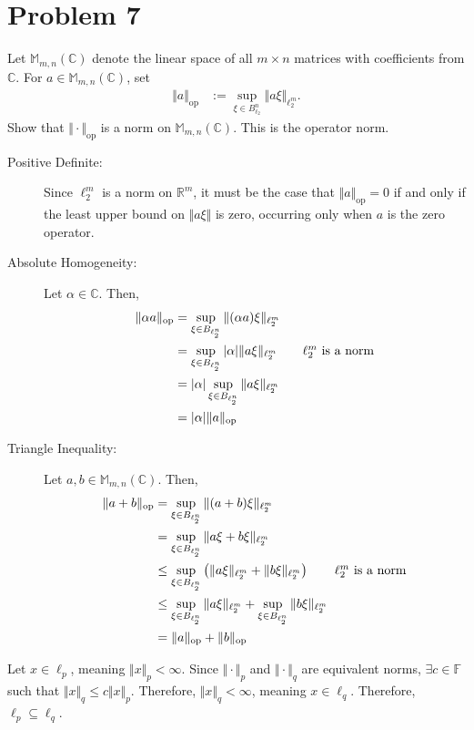 \documentclass[10pt]{extarticle}
\newcommand{\R}{\mathbb{R}}
\begin{document}
  \section{Problem 7}%
  Let $\mathbb{M}_{m,n}(\mathbb{C})$ denote the linear space of all $m\times n$ matrices with coefficients from $\mathbb{C}$. For $a\in \mathbb{M}_{m,n}(\mathbb{C})$, set
  \begin{align*}
    \Vert a\Vert_{\text{op}} &:= \sup_{\xi\in B_{\ell_2}^n}\Vert a\xi\Vert_{\ell_2^{m}}.
  \end{align*}
  Show that $\Vert \cdot \Vert_{\text{op}}$ is a norm on $\mathbb{M}_{m,n}(\mathbb{C})$. This is the operator norm.
  \begin{description}
    \item[Positive Definite:] Since $\ell_{2}^{m}$ is a norm on $\R^m$, it must be the case that $\Vert a\Vert_{\text{op}} = 0$ if and only if the least upper bound on $\Vert a\xi\Vert$ is zero, occurring only when $a$ is the zero operator.
    \item[Absolute Homogeneity:] Let $\alpha\in \mathbb{C}$. Then,
      \begin{align*}
        \Vert \alpha a \Vert_{\text{op}} &= \sup_{\xi\in B_{\ell_2^{n}}}\Vert (\alpha a)\xi\Vert_{\ell_{2}^{m}}\\
                                         &= \sup_{\xi\in B_{\ell_{2}^{n}}}|\alpha|\Vert a \xi \Vert_{\ell_{2}^{m}}\tag*{$\ell_{2}^{m}$ is a norm}\\
                                         &= |\alpha|\sup_{\xi\in B_{\ell_2^{n}}}\Vert a \xi\Vert_{\ell_{2}^{m}}\\
                                         &= |\alpha|\Vert a \Vert_{\text{op}}
      \end{align*}
    \item[Triangle Inequality:] Let $a,b \in \mathbb{M}_{m,n}(\mathbb{C})$. Then,
      \begin{align*}
        \Vert a + b \Vert_{\text{op}} &= \sup_{\xi\in B_{\ell_{2}^{n}}} \Vert (a+b)\xi\Vert_{\ell_{2}^{m}}\\
                                      &= \sup_{\xi \in B_{\ell_{2}^{n}}} \Vert a\xi + b\xi\Vert_{\ell_2^{m}}\\
                                      &\leq \sup_{\xi\in B_{\ell_2^{n}}} \left(\Vert a\xi\Vert_{\ell_{2}^{m}} + \Vert b\xi\Vert_{\ell_{2}^{m}}\right)\tag*{$\ell_{2}^{m}$ is a norm}\\
                                      &\leq \sup_{\xi\in B_{\ell_{2}^{n}}}\Vert a\xi\Vert_{\ell_{2}^{m}} + \sup_{\xi\in B_{\ell_{2}^{n}}} \Vert b\xi \Vert_{\ell_{2}^{m}}\\
                                      &= \Vert a\Vert_{\text{op}} + \Vert b \Vert_{\text{op}}
      \end{align*}
  \end{description}
  Let $x\in \ell_{p}$, meaning $\Vert x \Vert_p < \infty$. Since $\Vert \cdot \Vert_{p}$ and $\Vert \cdot \Vert_q$ are equivalent norms, $\exists c\in \mathbb{F}$ such that $\Vert x \Vert_{q} \leq c\Vert x \Vert_{p}$. Therefore, $\Vert x \Vert_{q} < \infty$, meaning $x\in \ell_{q}$. Therefore, $\ell_{p} \subseteq \ell_{q}$.
\end{document}
